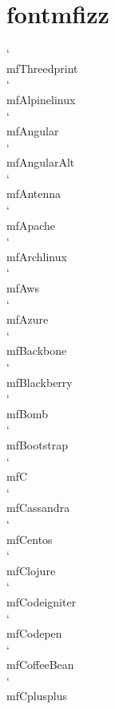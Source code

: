 \documentclass[parskip=half, twocolumn, 13pt]{scrartcl}
\begin{document}
\section*{fontmfizz}
\mfThreedprint \quad \char`\\mfThreedprint \\
\mfAlpinelinux \quad \char`\\mfAlpinelinux \\
\mfAngular \quad \char`\\mfAngular \\
\mfAngularAlt \quad \char`\\mfAngularAlt \\
\mfAntenna \quad \char`\\mfAntenna \\
\mfApache \quad \char`\\mfApache \\
\mfArchlinux \quad \char`\\mfArchlinux \\
\mfAws \quad \char`\\mfAws \\
\mfAzure \quad \char`\\mfAzure \\
\mfBackbone \quad \char`\\mfBackbone \\
\mfBlackberry \quad \char`\\mfBlackberry \\
\mfBomb \quad \char`\\mfBomb \\
\mfBootstrap \quad \char`\\mfBootstrap \\
\mfC \quad \char`\\mfC \\
\mfCassandra \quad \char`\\mfCassandra \\
\mfCentos \quad \char`\\mfCentos \\
\mfClojure \quad \char`\\mfClojure \\
\mfCodeigniter \quad \char`\\mfCodeigniter \\
\mfCodepen \quad \char`\\mfCodepen \\
\mfCoffeeBean \quad \char`\\mfCoffeeBean \\
\mfCplusplus \quad \char`\\mfCplusplus \\
\end{document}
